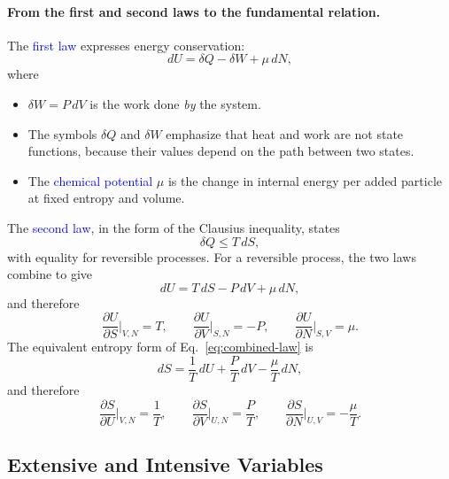 \paragraph{From the first and second laws to the fundamental relation.}
The \textcolor{blue}{first law} expresses energy conservation:
\begin{equation}
    \boxed{dU = \delta Q-\delta W+\mu\, dN,}
\end{equation}
where
\begin{itemize}
    \item $\delta W=P\,dV$ is the work done \emph{by} the system.
    \item The symbols $\delta Q$ and $\delta W$ emphasize that heat and work
    are not state functions, because their values depend on the path
    between two states.
    \item The \textcolor{blue}{chemical potential} $\mu$ is the change in
    internal energy per added particle at fixed entropy and volume.
\end{itemize}
The \textcolor{blue}{second law}, in the form of the Clausius inequality,
states
\begin{equation}
    \boxed{\delta Q\leq T\,dS,}
\end{equation}
with equality for reversible processes. For a reversible process, the two
laws combine to give
\begin{equation}
    \boxed{dU=T\,dS-P\,dV+\mu\, dN,}
    \label{eq:combined-law}
\end{equation}
and therefore
\begin{equation}
    \boxed{
    \frac{\partial U}{\partial S}\bigg|_{V,N}=T, \qquad
    \frac{\partial U}{\partial V}\bigg|_{S,N}=-P, \qquad
    \frac{\partial U}{\partial N}\bigg|_{S,V}=\mu.}
    \label{eq:U-derivs}
\end{equation}
The equivalent entropy form of Eq.~\eqref{eq:combined-law} is
\begin{equation}
    \boxed{dS=\frac{1}{T}\,dU+\frac{P}{T}\,dV-\frac{\mu}{T}\,dN,}
\end{equation}
and therefore
\begin{equation}
    \boxed{
    \frac{\partial S}{\partial U}\bigg|_{V,N}=\frac{1}{T}, \qquad
    \frac{\partial S}{\partial V}\bigg|_{U,N}=\frac{P}{T}, \qquad
    \frac{\partial S}{\partial N}\bigg|_{U,V}=-\frac{\mu}{T}.}
    \label{eq:S-derivs}
\end{equation}

\subsection{Extensive and Intensive Variables}

